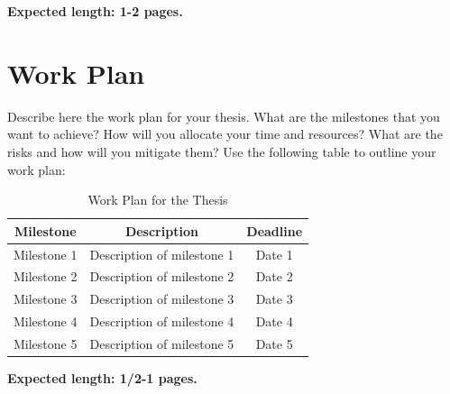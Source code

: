 \documentclass{imc-rai}
\begin{document}
\noindent \textbf{Expected length: 1-2 pages.}


\section*{Work Plan}

Describe here the work plan for your thesis. What are the milestones that you want to achieve? How will you allocate your time and resources? What are the risks and how will you mitigate them?
Use the following table to outline your work plan:
\begin{table}[ht]
\centering
\begin{tabular}{|c|c|c|}
\hline
\textbf{Milestone} & \textbf{Description} & \textbf{Deadline} \\
\hline
Milestone 1 & Description of milestone 1 & Date 1 \\
\hline
Milestone 2 & Description of milestone 2 & Date 2 \\
\hline
Milestone 3 & Description of milestone 3 & Date 3 \\
\hline
Milestone 4 & Description of milestone 4 & Date 4 \\
\hline
Milestone 5 & Description of milestone 5 & Date 5 \\
\hline
\end{tabular}
\caption{Work Plan for the Thesis}
\label{tab:workplan}
\end{table}

\noindent \textbf{Expected length: 1/2-1 pages.}


%
%
%
%
%

\backmatter%
	
 \typeout{}
	
	
\end{document}
